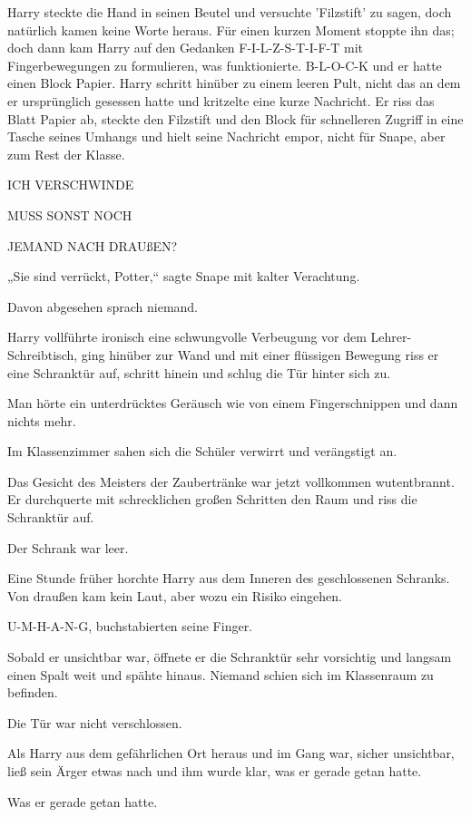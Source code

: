 {Harry steckte die Hand in seinen Beutel und versuchte 'Filzstift' zu sagen, doch natürlich kamen keine Worte heraus. Für einen kurzen Moment stoppte ihn das; doch dann kam Harry auf den Gedanken F-I-L-Z-S-T-I-F-T mit Fingerbewegungen zu formulieren, was funktionierte. B-L-O-C-K und er hatte einen Block Papier. Harry schritt hinüber zu einem leeren Pult, nicht das an dem er ursprünglich gesessen hatte und kritzelte eine kurze Nachricht. Er riss das Blatt Papier ab, steckte den Filzstift und den Block für schnelleren Zugriff in eine Tasche seines Umhangs und hielt seine Nachricht empor, nicht für Snape, aber zum Rest der Klasse.

ICH VERSCHWINDE

MUSS SONST NOCH

JEMAND NACH DRAUßEN?

„Sie sind verrückt, Potter,“ sagte Snape mit kalter Verachtung.

Davon abgesehen sprach niemand.

Harry vollführte ironisch eine schwungvolle Verbeugung vor dem Lehrer-Schreibtisch, ging hinüber zur Wand und mit einer flüssigen Bewegung riss er eine Schranktür auf, schritt hinein und schlug die Tür hinter sich zu.

Man hörte ein unterdrücktes Geräusch wie von einem Fingerschnippen und dann nichts mehr.

Im Klassenzimmer sahen sich die Schüler verwirrt und verängstigt an.

Das Gesicht des Meisters der Zaubertränke war jetzt vollkommen wutentbrannt. Er durchquerte mit schrecklichen großen Schritten den Raum und riss die Schranktür auf.

Der Schrank war leer.

\later

Eine Stunde früher horchte Harry aus dem Inneren des geschlossenen Schranks. Von draußen kam kein Laut, aber wozu ein Risiko eingehen.

U-M-H-A-N-G, buchstabierten seine Finger.

Sobald er unsichtbar war, öffnete er die Schranktür sehr vorsichtig und langsam einen Spalt weit und spähte hinaus. Niemand schien sich im Klassenraum zu befinden.

Die Tür war nicht verschlossen.

Als Harry aus dem gefährlichen Ort heraus und im Gang war, sicher unsichtbar, ließ sein Ärger etwas nach und ihm wurde klar, was er gerade getan hatte.

Was er gerade getan hatte.

}
